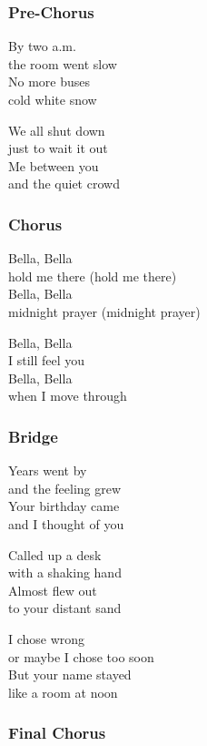 \subsubsection{Pre-Chorus}\label{pre-chorus-34}

By two a.m.\\
the room went slow\\
No more buses\\
cold white snow

We all shut down\\
just to wait it out\\
Me between you\\
and the quiet crowd

\subsubsection{Chorus}\label{chorus-54}

Bella, Bella\\
hold me there (hold me there)\\
Bella, Bella\\
midnight prayer (midnight prayer)

Bella, Bella\\
I still feel you\\
Bella, Bella\\
when I move through

\subsubsection{Bridge}\label{bridge-20}

Years went by\\
and the feeling grew\\
Your birthday came\\
and I thought of you

Called up a desk\\
with a shaking hand\\
Almost flew out\\
to your distant sand

I chose wrong\\
or maybe I chose too soon\\
But your name stayed\\
like a room at noon

\subsubsection{Final Chorus}\label{final-chorus-7}

